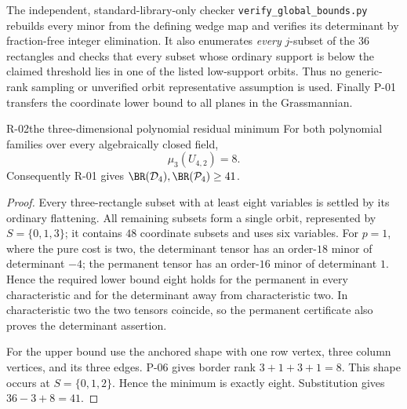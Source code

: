 The independent, standard-library-only checker
\texttt{verify\_global\_bounds.py} rebuilds every minor
from the defining wedge map and verifies its determinant by
fraction-free integer elimination. It also enumerates
\emph{every} \(j\)-subset of the \(36\) rectangles and
checks that every subset whose ordinary support is below
the claimed threshold lies in one of the listed low-support
orbits. Thus no generic-rank sampling or unverified orbit
representative assumption is used. Finally P-01 transfers
the coordinate lower bound to all planes in the Grassmannian.

\begin{finding}{R-02}{the three-dimensional polynomial residual minimum}
For both polynomial families over every algebraically closed
field,
\[
 \mu_3(U_{4,2})=8.
\]
Consequently R-01 gives
\(\BR(\mathcal D_4),\BR(\mathcal P_4)\geq41\).
\end{finding}
\begin{proof}
Every three-rectangle subset with at least eight variables
is settled by its ordinary flattening. All remaining subsets
form a single orbit, represented by \(S=\{0,1,3\}\); it
contains \(48\) coordinate subsets and uses six variables.
For \(p=1\), where the pure cost is two, the determinant
tensor has an order-\(18\) minor of determinant \(-4\);
the permanent tensor has an order-\(16\) minor of determinant
\(1\). Hence the required lower bound eight holds for the
permanent in every characteristic and for the determinant
away from characteristic two. In characteristic two the
two tensors coincide, so the permanent certificate also
proves the determinant assertion.

For the upper bound use the anchored shape with one row
vertex, three column vertices, and its three edges.
P-06 gives border rank \(3+1+3+1=8\). This shape occurs
at \(S=\{0,1,2\}\). Hence the minimum is exactly eight.
Substitution gives \(36-3+8=41\).
\end{proof}


